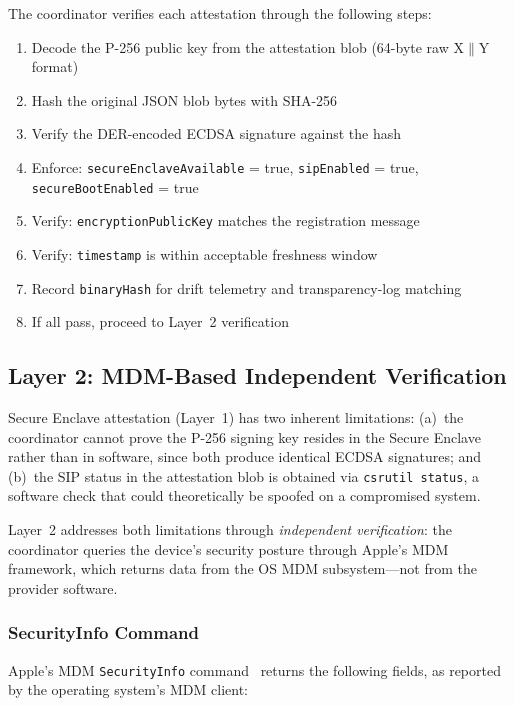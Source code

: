 \documentclass[10pt,twocolumn,letterpaper]{article}
\begin{document}
The coordinator verifies each attestation through the following steps:
\begin{enumerate}[leftmargin=*,itemsep=1pt]
    \item Decode the P-256 public key from the attestation blob (64-byte raw X$\|$Y format)
    \item Hash the original JSON blob bytes with SHA-256
    \item Verify the DER-encoded ECDSA signature against the hash
    \item Enforce: \texttt{secureEnclaveAvailable} = true, \texttt{sipEnabled} = true, \texttt{secureBootEnabled} = true
    \item Verify: \texttt{encryptionPublicKey} matches the registration message
    \item Verify: \texttt{timestamp} is within acceptable freshness window
    \item Record \texttt{binaryHash} for drift telemetry and transparency-log matching
    \item If all pass, proceed to Layer~2 verification
\end{enumerate}

\subsection{Layer 2: MDM-Based Independent Verification}
\label{sec:mdm}

Secure Enclave attestation (Layer~1) has two inherent limitations: (a)~the coordinator cannot prove the P-256 signing key resides in the Secure Enclave rather than in software, since both produce identical ECDSA signatures; and (b)~the SIP status in the attestation blob is obtained via \texttt{csrutil status}, a software check that could theoretically be spoofed on a compromised system.

Layer~2 addresses both limitations through \emph{independent verification}: the coordinator queries the device's security posture through Apple's MDM framework, which returns data from the OS MDM subsystem---not from the provider software.

\subsubsection{SecurityInfo Command}

Apple's MDM \texttt{SecurityInfo} command~\cite{apple-mdm} returns the following fields, as reported by the operating system's MDM client:
\end{document}
